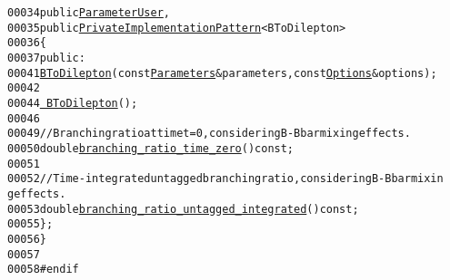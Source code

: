 \begin{footnotesize}
\begin{alltt}
00034         \textcolor{keyword}{public} \hyperlink{classeos_1_1ParameterUser}{ParameterUser},
00035         \textcolor{keyword}{public} \hyperlink{classeos_1_1PrivateImplementationPattern}{PrivateImplementationPattern}<BToDilepton>
00036     \{
00037         \textcolor{keyword}{public}:
00041             \hyperlink{classeos_1_1BToDilepton_a4e95160c3e54cd1dcb87832c7ccdd15e}{BToDilepton}(\textcolor{keyword}{const} \hyperlink{classeos_1_1Parameters}{Parameters} & parameters, \textcolor{keyword}{const} \hyperlink{classeos_1_1Options}{Options} & options);
00042 
00044             \hyperlink{classeos_1_1BToDilepton_a2a4cc57a5b21d062ecedc52215f03516}{~BToDilepton}();
00046 
00049             \textcolor{comment}{// Branching ratio at time t = 0, considering B-Bbar mixing effects.}
00050             \textcolor{keywordtype}{double} \hyperlink{classeos_1_1BToDilepton_abd3e3629c6477f74ada275e2033035f1}{branching_ratio_time_zero}() \textcolor{keyword}{const};
00051 
00052             \textcolor{comment}{// Time-integrated untagged branching ratio, considering B-Bbar mixin
      g effects.}
00053             \textcolor{keywordtype}{double} \hyperlink{classeos_1_1BToDilepton_afd43a14338c4bc5268b4b9c41ab14c7f}{branching_ratio_untagged_integrated}() \textcolor{keyword}{const};
00055     \};
00056 \}
00057 
00058 \textcolor{preprocessor}{#endif}
\end{alltt}\end{footnotesize}
